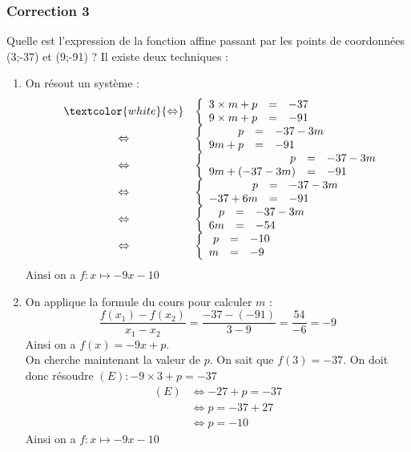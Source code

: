 \documentclass[15pt, mathserif]{beamer}
\begin{document}
\begin{frame}
\vspace{-10mm}
	\frametitle{Correction 3}
\vspace*{1cm} 
 \footnotesize{Quelle est l'expression de la fonction affine passant par les points de coordonnées (3;-37) et (9;-91) ? Il existe deux techniques :} 
 \begin{multicols}{2} 
 \begin{enumerate} 
 \item On résout un système : $$ \begin{array}{rcl} 
 & \textcolor{white}{\Leftrightarrow} & 
 \left 
 \{\begin{array}{rcl}3\times m + p&=&-37 \\ 
 9\times m+p&=&-91\end{array} \right. \\ 
 &\Leftrightarrow & \left 
 \{\begin{array}{rcl} p&=&-37-3m \\ 
 9m+p&=&-91\end{array} \right. \\ 
 &\Leftrightarrow & \left 
 \{\begin{array}{rcl} p&=&-37-3m \\ 
 9m+(-37-3m) &=&-91\end{array} \right. \\ &\Leftrightarrow& \left \{\begin{array}{rcl}p&=&-37-3m \\ 
 -37+6m&=&-91\end{array} \right. \\ &\Leftrightarrow& \left \{\begin{array}{rcl}p&=&-37-3m \\ 
 6m&=&-54\end{array} \right. \\  &\Leftrightarrow& \left \{\begin{array}{rcl} p&=&-10 \\  m&=&-9\end{array}\right. \end{array}$$ 
 Ainsi on a $f:x\mapsto -9x-10$ 
 \columnbreak 
 \item 
 \footnotesize{On applique la formule du cours pour calculer $m$ :$$ \dfrac{f(x_1)-f(x_2)}{x_1-x_2}=\dfrac{-37-\left(-91\right)}{3-9}= \dfrac{54}{-6}=-9$$} \footnotesize{ Ainsi on a $f(x)= -9x +p $. 
  \\ On cherche maintenant la valeur de $p$. On sait que $f(3)=-37$. On doit donc résoudre $(E): -9\times3+p=-37$}	 
 \begin{align*} (E)& \Leftrightarrow -27+p=-37\\
		 	 & \Leftrightarrow p=-37+27\\
			 & \Leftrightarrow p=-10
	 \end{align*} 
 Ainsi on a $f:x\mapsto -9x-10$ 
 \end{enumerate} 
 \end{multicols} 
 \end{frame}
\end{document}
